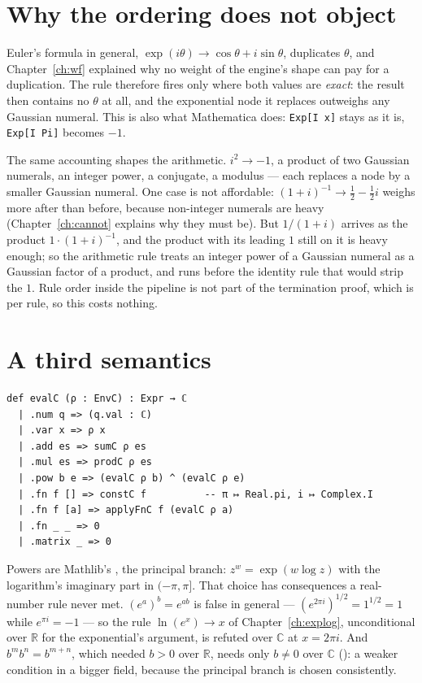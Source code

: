\section{Why the ordering does not object}

Euler's formula in general, $\exp(i\theta) \to \cos\theta + i\sin\theta$, duplicates $\theta$, and
Chapter~\ref{ch:wf} explained why no weight of the engine's shape can pay for a duplication. The
rule  therefore fires only where both values are \emph{exact}: the result then
contains no $\theta$ at all, and the exponential node it replaces outweighs any Gaussian numeral.
This is also what Mathematica does: \texttt{Exp[I x]} stays as it is, \texttt{Exp[I Pi]} becomes
$-1$.

The same accounting shapes the arithmetic. $i^2 \to -1$, a product of two Gaussian numerals, an
integer power, a conjugate, a modulus --- each replaces a node by a smaller Gaussian numeral. One
case is not affordable: $(1 + i)^{-1} \to \frac{1}{2} - \frac{1}{2} i$ weighs more after than
before, because non-integer numerals are heavy (Chapter~\ref{ch:cannot} explains why they must
be). But $1/(1 + i)$ arrives as the product $1 \cdot (1 + i)^{-1}$, and the product with its
leading $1$ still on it is heavy enough; so the arithmetic rule treats an integer power of a
Gaussian numeral as a Gaussian factor of a product, and runs before the identity rule that would
strip the $1$. Rule order inside the pipeline is not part of the termination proof, which is per
rule, so this costs nothing.

\section{A third semantics}

\begin{verbatim}
def evalC (ρ : EnvC) : Expr → ℂ
  | .num q => (q.val : ℂ)
  | .var x => ρ x
  | .add es => sumC ρ es
  | .mul es => prodC ρ es
  | .pow b e => (evalC ρ b) ^ (evalC ρ e)
  | .fn f [] => constC f          -- π ↦ Real.pi, i ↦ Complex.I
  | .fn f [a] => applyFnC f (evalC ρ a)
  | .fn _ _ => 0
  | .matrix _ => 0
\end{verbatim}

Powers are Mathlib's , the principal branch: $z^w = \exp(w \log z)$ with the
logarithm's imaginary part in $(-\pi, \pi]$. That choice has consequences a real-number rule never
met. $(e^a)^b = e^{ab}$ is false in general --- $(e^{2\pi i})^{1/2} = 1^{1/2} = 1$ while $e^{\pi i}
= -1$ --- so the rule $\ln(e^x) \to x$ of Chapter~\ref{ch:explog}, unconditional over $\mathbb{R}$
for the exponential's argument, is refuted over $\mathbb{C}$ at $x = 2\pi i$. And $b^m b^n =
b^{m+n}$, which needed $b > 0$ over $\mathbb{R}$, needs only $b \neq 0$ over $\mathbb{C}$
(): a weaker condition in a bigger field, because the principal branch is
chosen consistently.

